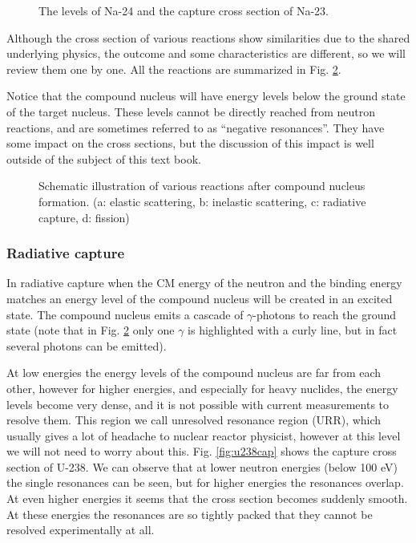 \begin{figure}[ht!]
\protect {}\protect
\caption{\label{fig:nalevels} \footnotesize{The levels of Na-24 and the capture cross section of Na-23.}}
\end{figure}

Although the cross section of various reactions show similarities due to the shared underlying physics, the outcome and some characteristics are different, so we will review them one by one. All the reactions are summarized in Fig. \ref{fig:levels}.

Notice that the compound nucleus will have energy levels below the ground state of the target nucleus. These levels cannot be directly reached from neutron reactions, and are sometimes referred to as ``negative resonances''. They have some impact on the cross sections, but the discussion of this impact is well outside of the subject of this text book.

\begin{figure}[ht!]
\protect {}\protect
\caption{\label{fig:levels} \footnotesize{Schematic illustration of various reactions after compound nucleus formation. (a: elastic scattering, b: inelastic scattering, c: radiative capture, d: fission)}}
\end{figure}


\subsubsection*{Radiative capture}

In radiative capture when the CM energy of the neutron and the binding energy matches an energy level of the compound nucleus will be created in an excited state. The compound nucleus emits a cascade of $\gamma$-photons to reach the ground state (note that in Fig. \ref{fig:levels} only one $\gamma$ is highlighted with a curly line, but in fact several photons can be emitted).

At low energies the energy levels of the compound nucleus are far from each other, however for higher energies, and especially for heavy nuclides, the energy levels become very dense, and it is not possible with current measurements to resolve them. This region we call unresolved resonance region (URR), which usually gives a lot of headache to nuclear reactor physicist, however at this level we will not need to worry about this. Fig. \ref{fig:u238cap} shows the capture cross section of U-238. We can observe that at lower neutron energies (below 100 eV) the single resonances can be seen, but for higher energies the resonances overlap. At even higher energies it seems that the cross section becomes suddenly smooth. At these energies the resonances are so tightly packed that they cannot be resolved experimentally at all.


